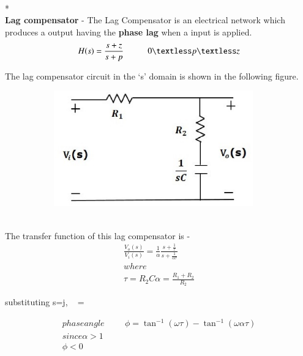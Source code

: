 \begin{enumerate}[label=\thesection.\arabic*.,ref=\thesection.\theenumi]
\begin{flushleft}
\\* \textbf{\\Lag compensator} - The Lag Compensator is an electrical network which produces a  output having the \textbf{phase lag} when a input is applied.
\begin{equation}
H(s) = \frac{s+z}{s+p}  \hspace{1cm} 0 \textless p \textless z
\centering
\end{equation}

 
The lag compensator circuit in the ‘s’ domain is shown in the following figure.
 
\begin{figure}[h]
 
\begin{subfigure}{0.5\textwidth}
\includegraphics[width=0.9\linewidth, height=5cm ,inner]{./figs/ee18btech11027/lag_compensator.eps} 
\label{fig:subim1}
\end{subfigure}
\end{figure}
\\
The transfer function of this lag compensator is -
\begin{align}
    \frac{V_o(s)}{V_i(s)} = \frac{1}{\alpha}  \frac{s + \frac{1}{\tau}}{s + \frac{1}{\alpha\tau}} \\
where\\
 \tau = R_2C  \alpha =\frac{R_1+R_2}{R_2}
\end{align}

substituting s=j\omega, \  =   

\begin{align}
phase angle \hspace{1cm}\phi = \tan^{-1} {(\omega\tau)} - \tan^{-1}{(\omega\alpha\tau)}\\
since \alpha > 1\\
\phi < 0
\end{align}
\\


\end{flushleft}
\end{enumerate}
